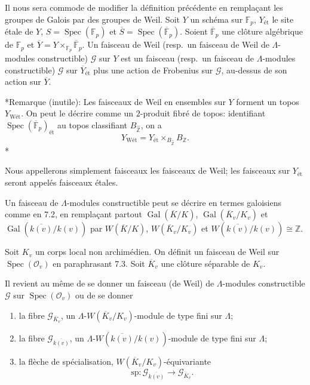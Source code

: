 \documentclass[11pt,a4paper]{amsart}
\theoremstyle{plain}
\theoremstyle{definition}
\DeclareMathOperator{\Gal}{Gal}
\DeclareMathOperator{\Spec}{Spec}
\newcommand{\dbZ}{\mathbb{Z}}
\newcommand{\dbF}{\mathbb{F}}
\newenvironment{para}{\par\noindent}{\par}
\newcommand{\scrO}{\mathscr{O}}
\newcommand{\ov}[1]{\overline{#1}}
\begin{document}
\begin{para}
Il nous sera commode de modifier la d\'efinition pr\'ec\'edente en rempla\c{c}ant les groupes de Galois par des groupes de Weil. Soit $Y$ un sch\'ema sur $\dbF_{p}$, $Y_{\text{\'et}}$ le site \'etale de $Y$, $S = \Spec(\dbF_{p})$ et $\ov{S} = \Spec(\ov{\dbF}_{p})$. Soient $\ov{\dbF}_{p}$ une cl\^oture alg\'ebrique de $\dbF_{p}$ et $\ov{Y} = Y \times_{\dbF_{p}} \ov{\dbF}_{p}$. Un faisceau de Weil (resp.~un faisceau de Weil de $\Lambda$-modules constructible) $\mathscr{G}$ sur $Y$ est un faisceau (resp.~un faisceau de $\Lambda$-modules constructible) $\mathscr{G}$ sur $\ov{Y}_{\text{\'et}}$ plus une action de Frobenius sur $\mathscr{G}$, au-dessus de son action sur $\ov{Y}$.

*Remarque (inutile): Les faisceaux de Weil en ensembles sur $Y$ forment un topos $Y_{\text{W\'et}}$. On peut le d\'ecrire comme un $2$-produit fibr\'e de topos: identifiant $\Spec(\ov{\dbF}_{p})_{\text{\'et}}$ au topos classifiant $B_{\hat{\dbZ}}$, on a
\[
Y_{\text{W\'et}} = Y_{\text{\'et}} \times_{B_{\hat{\dbZ}}} B_{\dbZ}.
\]*

Nous appellerons simplement faisceaux les faisceaux de Weil; les faisceaux sur $Y_{\text{\'et}}$ seront appel\'es faisceaux \'etales.
\end{para}

\begin{para}
Un faisceau de $\Lambda$-modules constructible peut se d\'ecrire en termes galoisiens comme en 7.2, en rempla\c{c}ant partout $\Gal(\ov{K}/K)$, $\Gal(\ov{K}_{v}/K_{v})$ et $\Gal(\ov{k(v)}/k(v))$ par $W(\ov{K}/K)$, $W(\ov{K}_{v}/K_{v})$ et $W(\ov{k(v)}/k(v)) \cong \dbZ$.
\end{para}

\begin{para}
Soit $K_{v}$ un corps local non archim\'edien. On d\'efinit un faisceau de Weil sur $\Spec(\scrO_{v})$ en paraphrasant 7.3. Soit $\ov{K}_{v}$ une cl\^oture s\'eparable de $K_{v}$.

Il revient au m\^eme de se donner un faisceau (de Weil) de $\Lambda$-modules constructible $\mathscr{G}$ sur $\Spec(\scrO_{v})$ ou de se donner
\begin{enumerate}
\item[(a)] la fibre $\mathscr{G}_{\ov{K}_{v}}$, un $\Lambda$-$W(\ov{K}_{v}/K_{v})$-module de type fini sur $\Lambda$;
\item[(b)] la fibre $\mathscr{G}_{\ov{k(v)}}$, un $\Lambda$-$W(\ov{k(v)}/k(v))$-module de type fini sur $\Lambda$;
\item[(c)] la fl\`eche de sp\'ecialisation, $W(\ov{K}_{v}/K_{v})$-\'equivariante
\[
\text{sp}: \mathscr{G}_{\ov{k(v)}} \longrightarrow \mathscr{G}_{\ov{K}_{v}}.
\]
\end{enumerate}
\end{para}
\end{document}
